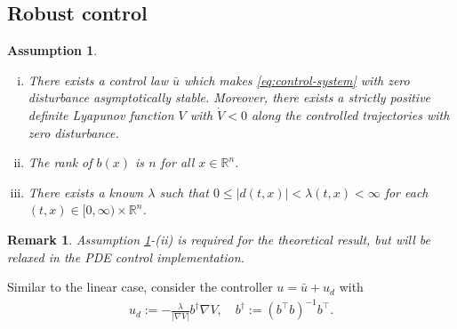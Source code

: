 \documentclass[10pt,a4paper]{amsart}
\newtheorem{assumption}{Assumption}
\newtheorem{remark}{Remark}
\newcommand{\tp}{^\top}
\newcommand{\inv}{^{-1}}
\newcommand{\R}{\mathbb{R}}
\newcommand{\ip}[2]{\langle #1, #2 \rangle}
\newcommand{\grad}{\nabla}
\begin{document}
\subsection{Robust control}
\begin{assumption}
\begin{enumerate}[(i)]
    \item There exists a control law $\bar{u}$ which makes \eqref{eq:control-system} with zero disturbance asymptotically stable. Moreover, there exists a strictly positive definite Lyapunov function $V$ with $\dot{V} < 0$ along the controlled trajectories with zero disturbance. 
    \item The rank of $b(x)$ is $n$ for all $x \in \R^n$. 
    \item There exists a known $\lambda$ such that $0 \le |d(t,x)| < \lambda(t,x) < \infty$ for each $(t,x) \in [0,\infty) \times \R^n$.
\end{enumerate}
\label{assn:b}
\end{assumption}
\begin{remark}
    Assumption \ref{assn:b}-(ii) is required for the theoretical result, but will be relaxed in the PDE control implementation. 
\end{remark}


Similar to the linear case, consider the controller $u = \bar{u} + u_d$ with 
\begin{align*}
    u_d := - \frac{\lambda}{| \grad V |} b^{\dagger} \grad V, \quad b^{\dagger} := (b\tp b)\inv b\tp.
\end{align*}
\end{document}
